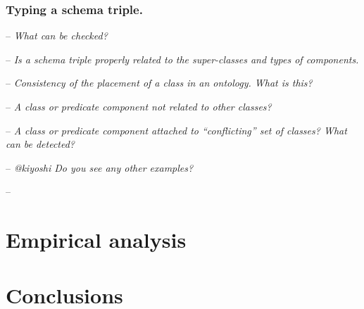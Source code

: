 \documentclass[runningheads]{llncs}
\newcommand{\nl}{\hfill\break}
\newcommand{\notes}[1]{\noindent\begin{small}-- \emph{#1}\\\end{small}}
\begin{document}
\subsubsection{Typing a schema triple.}\nl

\notes{What can be checked?}
\notes{Is a schema triple properly related to the super-classes and types of components.}
\notes{Consistency of the placement of a class in an ontology. What is this?}
\notes{A class or predicate component not related to other classes?}
\notes{A class or predicate component attached to ``conflicting'' set of classes? What can be detected?}
\notes{@kiyoshi Do you see any other examples?}
\notes{}



\section{Empirical analysis}

\section{Conclusions}



%



\end{document}
